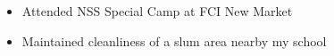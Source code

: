 \documentclass[10pt,a4paper,ragged2e,withhyper]{altacv}
\begin{document}
\begin{paracol}{2}



\begin{itemize}
\item Attended NSS Special Camp at FCI New Market
\item Maintained cleanliness of a slum area nearby my school 
\end{itemize}
\switchcolumn















\end{paracol}
\end{document}
